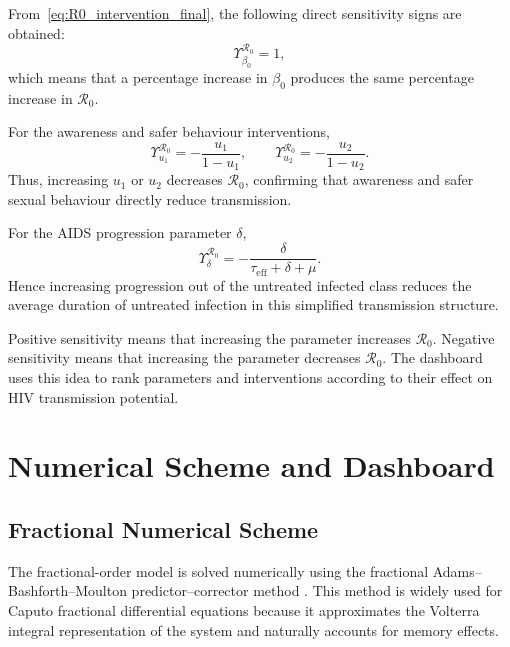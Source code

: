 \documentclass[12pt,a4paper,oneside]{report}
\newcommand{\Rzero}{\mathcal{R}_0}
\newcommand{\taueff}{\tau_{\mathrm{eff}}}
\begin{document}
From~\eqref{eq:R0_intervention_final}, the following direct sensitivity signs are obtained:
\[
\Upsilon_{\beta_0}^{\Rzero}=1,
\]
which means that a percentage increase in $\beta_0$ produces the same percentage increase in $\Rzero$.

For the awareness and safer behaviour interventions,
\[
\Upsilon_{u_1}^{\Rzero}=-\frac{u_1}{1-u_1},
\qquad
\Upsilon_{u_2}^{\Rzero}=-\frac{u_2}{1-u_2}.
\]
Thus, increasing $u_1$ or $u_2$ decreases $\Rzero$, confirming that awareness and safer sexual behaviour directly reduce transmission.

For the AIDS progression parameter $\delta$,
\[
\Upsilon_{\delta}^{\Rzero}
=
-\frac{\delta}{\taueff+\delta+\mu}.
\]
Hence increasing progression out of the untreated infected class reduces the average duration of untreated infection in this simplified transmission structure.

\newpage 


\begin{remarkbox}[title={Sensitivity interpretation}]
Positive sensitivity means that increasing the parameter increases $\Rzero$. Negative sensitivity means that increasing the parameter decreases $\Rzero$. The dashboard uses this idea to rank parameters and interventions according to their effect on HIV transmission potential.
\end{remarkbox}

\chapter{Numerical Scheme and Dashboard}

\section{Fractional Numerical Scheme}

The fractional-order model is solved numerically using the fractional Adams--Bashforth--Moulton predictor--corrector method \citep{Diethelm2002,Diethelm2010}. This method is widely used for Caputo fractional differential equations because it approximates the Volterra integral representation of the system and naturally accounts for memory effects.
\end{document}

